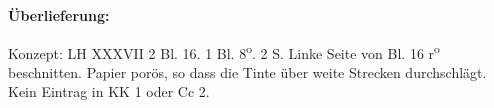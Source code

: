       
               
                \begin{ledgroupsized}[r]{120mm}
                \footnotesize 
                \pstart                
                \noindent\textbf{\"{U}berlieferung:}   
                \pend
                \end{ledgroupsized}
            
              
                            \begin{ledgroupsized}[r]{114mm}
                            \footnotesize 
                            \pstart \parindent -6mm
                            Konzept: LH XXXVII 2 Bl. 16. 1 Bl. 8\textsuperscript{o}. 2 S.  Linke Seite von Bl. 16 r\textsuperscript{o} beschnitten. Papier por\"{o}s, so dass die Tinte \"{u}ber weite Strecken durchschl\"{a}gt.\\Kein Eintrag in KK 1 oder Cc 2. \pend
                            \end{ledgroupsized}
                \vspace*{8mm}
                \pstart 
                \normalsize
